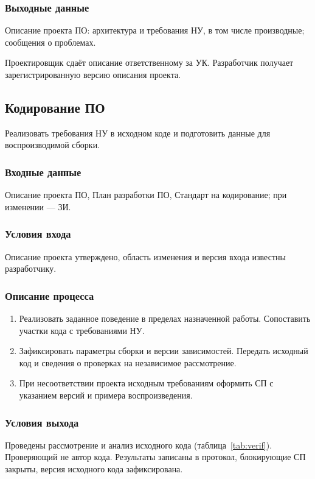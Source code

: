 \documentclass{tpks}
\begin{document}
\subsubsection{Выходные данные}
Описание проекта ПО: архитектура и требования НУ, в том числе производные; сообщения о проблемах.

Проектировщик сдаёт описание ответственному за УК. Разработчик получает зарегистрированную версию описания проекта.

\subsection{Кодирование ПО}
Реализовать требования НУ в исходном коде и подготовить данные для воспроизводимой сборки.

\subsubsection{Входные данные}
Описание проекта ПО, План разработки ПО, Стандарт на кодирование; при изменении --- ЗИ.

\subsubsection{Условия входа}
Описание проекта утверждено, область изменения и версия входа известны разработчику.

\subsubsection{Описание процесса}
\begin{enumerate}
\item Реализовать заданное поведение в пределах назначенной работы. Сопоставить участки кода с требованиями НУ.
\item Зафиксировать параметры сборки и версии зависимостей. Передать исходный код и сведения о проверках на независимое рассмотрение.
\item При несоответствии проекта исходным требованиям оформить СП с указанием версий и примера воспроизведения.
\end{enumerate}

\subsubsection{Условия выхода}
Проведены рассмотрение и анализ исходного кода (таблица~\ref{tab:verif}). Проверяющий не автор кода. Результаты записаны в протокол, блокирующие СП закрыты, версия исходного кода зафиксирована.
\end{document}
